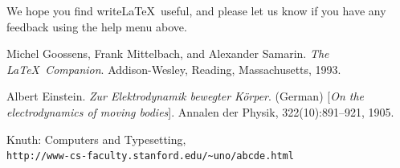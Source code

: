 \documentclass[a4paper]{article}
\begin{document}
We hope you find write\LaTeX\ useful, and please let us know if you have any feedback using the help menu above.

\renewcommand{\refname}{Bibliografia}
\begin{thebibliography}{9}
  Michel Goossens, Frank Mittelbach, and Alexander Samarin. 
  \textit{The \LaTeX\ Companion}. 
  Addison-Wesley, Reading, Massachusetts, 1993.
   
  Albert Einstein. 
  \textit{Zur Elektrodynamik bewegter K{\"o}rper}. (German) 
  [\textit{On the electrodynamics of moving bodies}]. 
  Annalen der Physik, 322(10):891–921, 1905.
   
  Knuth: Computers and Typesetting,
  \\\texttt{http://www-cs-faculty.stanford.edu/\~{}uno/abcde.html}
  \end{thebibliography}
\end{document}
